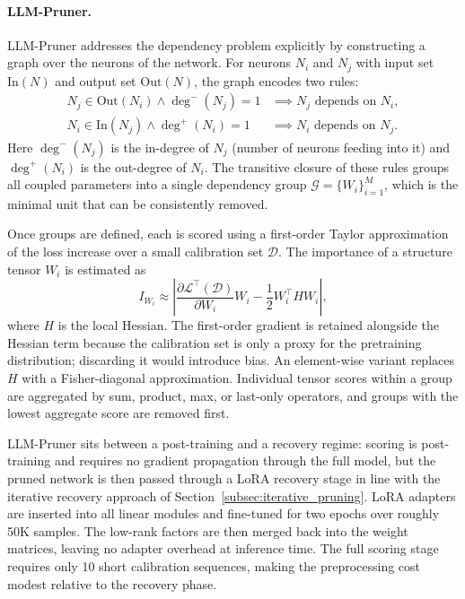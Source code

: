 \paragraph{LLM-Pruner.}
LLM-Pruner \cite{ma2023llmpruner} addresses the dependency problem explicitly by constructing a graph over the neurons of the network. For neurons $N_i$ and $N_j$ with input set $\mathrm{In}(N)$ and output set $\mathrm{Out}(N)$, the graph encodes two rules:
\begin{align}
	N_j \in \mathrm{Out}(N_i) \wedge \deg^{-}(N_j)=1 &\implies N_j \text{ depends on } N_i, \label{eq:dep1}\\
	N_i \in \mathrm{In}(N_j) \wedge \deg^{+}(N_i)=1 &\implies N_i \text{ depends on } N_j. \label{eq:dep2}
\end{align}
Here $\deg^{-}(N_j)$ is the in-degree of $N_j$ (number of neurons feeding into it) and $\deg^{+}(N_i)$ is the out-degree of $N_i$. The transitive closure of these rules groups all coupled parameters into a single dependency group $\mathcal{G} = \{W_i\}_{i=1}^M$, which is the minimal unit that can be consistently removed.

Once groups are defined, each is scored using a first-order Taylor approximation of the loss increase over a small calibration set $\mathcal{D}$. The importance of a structure tensor $W_i$ is estimated as
\begin{equation}
	I_{W_i}
	\approx
	\left|
	\frac{\partial \mathcal{L}^{\top}(\mathcal{D})}{\partial W_i}W_i
	-\frac{1}{2}W_i^{\top}HW_i
	\right|,
	\label{eq:taylor-vector}
\end{equation}
where $H$ is the local Hessian. The first-order gradient is retained alongside the Hessian term because the calibration set is only a proxy for the pretraining distribution; discarding it would introduce bias. An element-wise variant replaces $H$ with a Fisher-diagonal approximation. Individual tensor scores within a group are aggregated by sum, product, max, or last-only operators, and groups with the lowest aggregate score are removed first.

LLM-Pruner sits between a post-training and a recovery regime: scoring is post-training and requires no gradient propagation through the full model, but the pruned network is then passed through a LoRA recovery stage in line with the iterative recovery approach of Section~\ref{subsec:iterative_pruning}. LoRA adapters \cite{hu2021lora} are inserted into all linear modules and fine-tuned for two epochs over roughly 50K samples. The low-rank factors are then merged back into the weight matrices, leaving no adapter overhead at inference time. The full scoring stage requires only 10 short calibration sequences, making the preprocessing cost modest relative to the recovery phase.

